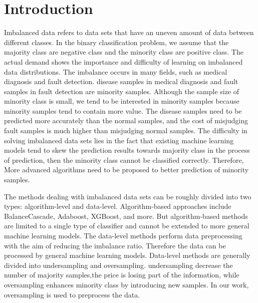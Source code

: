 \documentclass[runningheads]{llncs}
\begin{document}
\section{Introduction}
Imbalanced data\cite{2004Editorial} refers to data sets that have an uneven 
amount of data between different classes. In the binary classification problem, 
we assume that the majority class are negative class and 
the minority class are positive class.
The actual demand shows the importance and difficulty of learning on imbalanced data distributions.
The imbalance occurs in many fields, such as medical 
diagnosis\cite{2013Computational,2019Electrocardiogram} and fault detection\cite{2018Imbalanced}.
disease samples in medical diagnosis and fault samples in fault detection are minority samples.
Although the sample size of minority class is small, 
we tend to be interested in minority samples because minority samples tend to contain more value.
The disease samples need to be predicted more accurately than the normal samples, 
and the cost of misjudging fault samples is much higher than misjudging normal samples.
The difficulty in solving imbalanced data sets lies in the fact that existing machine 
learning models tend to skew the prediction results towards 
majority class in the process of prediction\cite{Victoria2013An}, then 
the minority class cannot be classified correctly\cite{2016A}. 
Therefore, More advanced algorithms need to be proposed to better prediction of minority samples.

The methods dealing with imbalanced data sets can be roughly
divided into two types: algorithm-level\cite{Myoung2015Geometric} and data-level\cite{2002SMOTE}.
Algorithm-based approaches include BalanceCascade\cite{2019Class}, Adaboost\cite{10.1007/3-540-59119-2_166}, 
XGBoost\cite{Chen_2016}, and more. But algorithm-based methods are limited 
to a single type of classifier\cite{2020Combined} and cannot be extended to more general machine learning models.
The data-level methods perform data preprocessing with the aim of reducing the imbalance ratio. Therefore 
the data can be processed by general machine learning models.
Data-level methods are generally divided into undersampling\cite{2015Undersampled} 
and oversampling\cite{2002SMOTE}. undersampling decrease the number of majority samples,the price is losing part of the information, 
while oversampling enhances minority class by introducing new samples\cite{2010A}. 
In our work, oversampling is used to preprocess the data.
\end{document}

